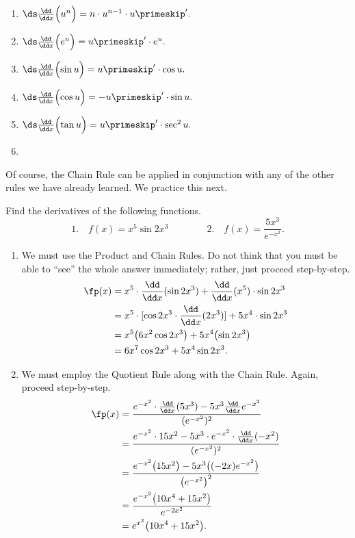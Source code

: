 \begin{multicols}{2}
\begin{enumerate}
	\item	$\ds\frac{\dd}{\dd x}\Bigl(u^n\Bigr) = n\cdot u^{n-1}\cdot u\primeskip'.$
	\item	$\ds\frac{\dd}{\dd x}\Bigl(e^u\Bigr) = u\primeskip'\cdot e^u.$
	\item	$\ds\frac{\dd}{\dd x}\Bigl(\sin u\Bigr) = u\primeskip'\cdot \cos u.$
	\item	$\ds\frac{\dd}{\dd x}\Bigl(\cos u\Bigr) = -u\primeskip'\cdot \sin u.$
	\item	$\ds\frac{\dd}{\dd x}\Bigl(\tan u\Bigr) = u\primeskip'\cdot \sec^2 u.$
	\item[]\bigskip
\end{enumerate}
\end{multicols}

Of course, the Chain Rule can be applied in conjunction with any of the other rules we have already learned. We practice this next.

\begin{example}\label{ex_chain4}%
Find the derivatives of the following functions.
\[
 1.\quad f(x) = x^5 \sin{2x^3} \qquad\qquad 2.\quad f(x) = \dfrac{5x^3}{e^{-x^2}}.
\]
\solution
\begin{enumerate}
\item	We must use the Product and Chain Rules. Do not think that you must be able to ``see'' the whole answer immediately; rather, just proceed step-by-step.
\begin{align*}
 \fp(x)
 &= x^5 \cdot \frac{\dd}{\dd x}(\sin 2x^3) + \frac{\dd}{\dd x}(x^5) \cdot \sin 2x^3\\
 &= x^5 \cdot [\cos 2x^3 \cdot \frac{\dd}{\dd x}(2x^3)] + 5x^4 \cdot \sin 2x^3\\
 &= x^5\bigl(6x^2\cos 2x^3\bigr) + 5x^4\bigl(\sin 2x^3\bigr)\\
 &= 6x^7\cos2x^3+5x^4\sin 2x^3.
\end{align*}
\item	We must employ the Quotient Rule along with the Chain Rule. Again, proceed step-by-step.
\begin{align*}
 \fp(x)
 &= \frac{e^{-x^2} \cdot \frac{\dd}{\dd x}(5x^3) - 5x^3\frac{\dd}{\dd x}e^{-x^2}}{(e^{-x^2})^2}\\
 &= \frac{e^{-x^2} \cdot 15x^2 - 5x^3 \cdot e^{-x^2} \cdot \frac{\dd}{\dd x}(-x^2)}{(e^{-x^2})^2}\\
 &= \frac{e^{-x^2}\bigl(15x^2\bigr) - 5x^3\bigl((-2x)e^{-x^2}\bigr)}{\bigl(e^{-x^2}\bigr)^2}\\
 &=\frac{e^{-x^2}\bigl(10x^4+15x^2\bigr)}{e^{-2x^2}}\\
 &= e^{x^2}\bigl(10x^4+15x^2\bigr).
\end{align*}
\end{enumerate}
\end{example}

